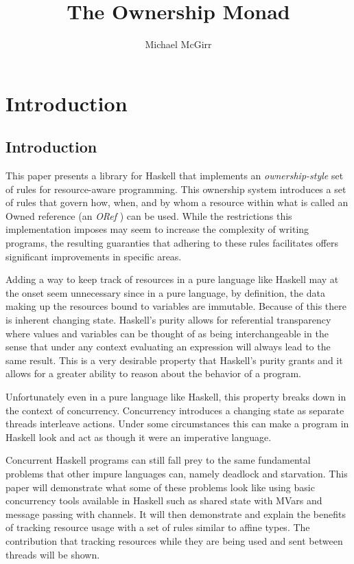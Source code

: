\documentclass[onehalf,11pt]{beavtex}
\title{The Ownership Monad}
\author{Michael McGirr}
\begin{document}
\maketitle

\mainmatter

\chapter{Introduction}
\section{Introduction}

This paper presents a library for Haskell that implements an \textit{ownership-style}
set of rules for resource-aware programming. This ownership system introduces a
set of rules that govern how, when, and by whom a resource within what is called
an Owned reference (an \textit{ORef} ) can be used. While the restrictions this
implementation imposes may seem to increase the complexity of writing programs,
the resulting guaranties that adhering to these rules facilitates offers
significant improvements in specific areas. %

Adding a way to keep track of resources in a pure language like Haskell may
at the onset seem unnecessary since in a pure language, by definition, %
the data making up the resources bound to variables are immutable. Because of
this there is inherent changing state.  Haskell's purity allows for referential
transparency where values and variables can be thought of as being
interchangeable in the sense that under any context evaluating an expression will
always lead to the same result.  This is a very desirable property that
Haskell's purity grants and it allows for a greater ability to reason about the
behavior of a program.

Unfortunately even in a pure language like Haskell, this property breaks down in
the context of concurrency.  Concurrency introduces a changing state as separate
threads interleave actions.  Under some circumstances this can make a program
in Haskell look and act as though it were an imperative language.

Concurrent Haskell programs can still fall prey to the same fundamental
problems that other impure languages can, namely deadlock and starvation.
This paper will demonstrate what some of these problems look like using
basic concurrency tools available in Haskell such as shared state with
MVars and message passing with channels.
It will then demonstrate and explain the benefits of tracking resource usage
with a set of rules similar to affine types. The contribution that
tracking resources while they are being used and sent between threads
will be shown. %
\end{document}
